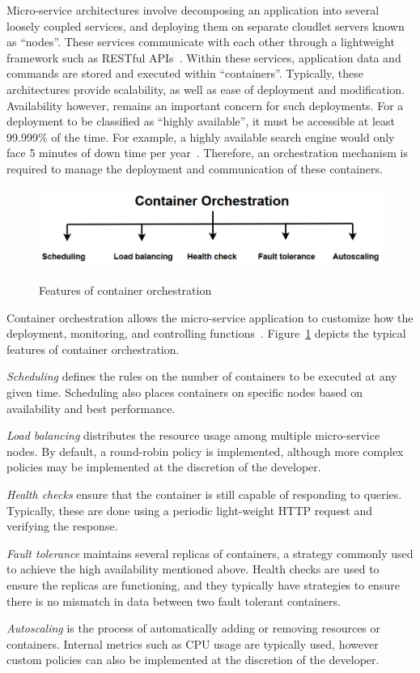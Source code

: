 Micro-service architectures involve decomposing an application into several loosely coupled services, and deploying them on separate cloudlet servers known as ``nodes''. These services communicate with each other through a lightweight framework such as RESTful APIs~\cite{li2021understanding}. Within these services, application data and commands are stored and executed within ``containers''. Typically, these architectures provide scalability, as well as ease of deployment and modification. Availability however, remains an important concern for such deployments. For a deployment to be classified as ``highly available'', it must be accessible at least 99.999\% of the time. For example, a highly available search engine would only face 5 minutes of down time per year~\cite{nabi2016availability}. Therefore, an orchestration mechanism is required to manage the deployment and communication of these containers.\par

\begin{figure}[htb]
    \centering
    \caption{Features of container orchestration}
    \includegraphics[width=0.9\linewidth]{Figures/Container-Orchestration.pdf}
    \label{fig:container-orchestration}
\end{figure}

Container orchestration allows the micro-service application to customize how the deployment, monitoring, and controlling functions~\cite{casalicchio2019container}. Figure~\ref{fig:container-orchestration} depicts the typical features of container orchestration.\par
\textit{Scheduling} defines the rules on the number of containers to be executed at any given time. Scheduling also places containers on specific nodes based on availability and best performance.\par
\textit{Load balancing} distributes the resource usage among multiple micro-service nodes. By default, a round-robin policy is implemented, although more complex policies may be implemented at the discretion of the developer.\par
\textit{Health checks} ensure that the container is still capable of responding to queries. Typically, these are done using a periodic light-weight HTTP request and verifying the response.\par
\textit{Fault tolerance} maintains several replicas of containers, a strategy commonly used to achieve the high availability mentioned above. Health checks are used to ensure the replicas are functioning, and they typically have strategies to ensure there is no mismatch in data between two fault tolerant containers.\par
\textit{Autoscaling} is the process of automatically adding or removing resources or containers. Internal metrics such as CPU usage are typically used, however custom policies can also be implemented at the discretion of the developer.\par

